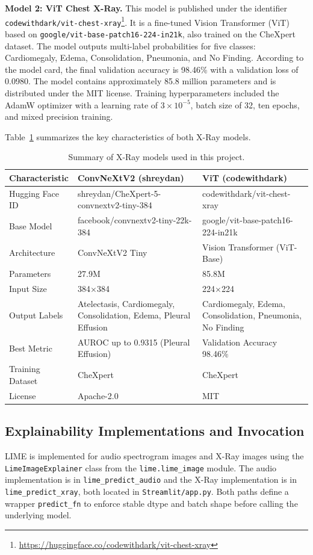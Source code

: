 \documentclass[11pt,a4paper]{article}
\begin{document}
\textbf{Model 2: ViT Chest X-Ray.}
This model is published under the identifier \texttt{codewithdark/vit-chest-xray}\footnote{\url{https://huggingface.co/codewithdark/vit-chest-xray}}. It is a fine-tuned Vision Transformer (ViT) based on \texttt{google/vit-base-patch16-224-in21k}, also trained on the CheXpert dataset. The model outputs multi-label probabilities for five classes: Cardiomegaly, Edema, Consolidation, Pneumonia, and No Finding. According to the model card, the final validation accuracy is 98.46\% with a validation loss of 0.0980. The model contains approximately 85.8 million parameters and is distributed under the MIT license. Training hyperparameters included the AdamW optimizer with a learning rate of $3 \times 10^{-5}$, batch size of 32, ten epochs, and mixed precision training.

Table~\ref{tab:xray_models} summarizes the key characteristics of both X-Ray models.

\begin{table}[h]
\centering
\caption{Summary of X-Ray models used in this project.}
\label{tab:xray_models}
\begin{tabular}{@{}p{3.5cm}p{5.5cm}p{5.5cm}@{}}
\toprule
\textbf{Characteristic} & \textbf{ConvNeXtV2 (shreydan)} & \textbf{ViT (codewithdark)} \\
\midrule
Hugging Face ID & shreydan/CheXpert-5-convnextv2-tiny-384 & codewithdark/vit-chest-xray \\
Base Model & facebook/convnextv2-tiny-22k-384 & google/vit-base-patch16-224-in21k \\
Architecture & ConvNeXtV2 Tiny & Vision Transformer (ViT-Base) \\
Parameters & 27.9M & 85.8M \\
Input Size & 384$\times$384 & 224$\times$224 \\
Output Labels & Atelectasis, Cardiomegaly, Consolidation, Edema, Pleural Effusion & Cardiomegaly, Edema, Consolidation, Pneumonia, No Finding \\
Best Metric & AUROC up to 0.9315 (Pleural Effusion) & Validation Accuracy 98.46\% \\
Training Dataset & CheXpert & CheXpert \\
License & Apache-2.0 & MIT \\
\bottomrule
\end{tabular}
\end{table}

\subsection{Explainability Implementations and Invocation}
LIME is implemented for audio spectrogram images and X-Ray images using the \texttt{LimeImageExplainer} class from the \texttt{lime.lime\_image} module. The audio implementation is in \texttt{lime\_predict\_audio} and the X-Ray implementation is in \texttt{lime\_predict\_xray}, both located in \texttt{Streamlit/app.py}. Both paths define a wrapper \texttt{predict\_fn} to enforce stable dtype and batch shape before calling the underlying model.
\end{document}
